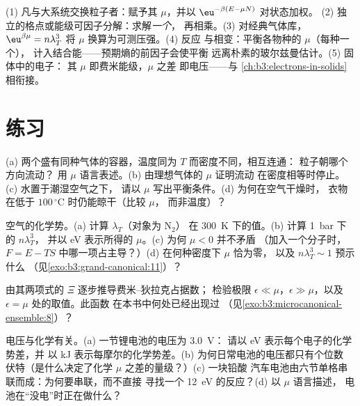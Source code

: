 \begin{method}[巨正则技巧]\label{met:b3:grand-canonical:method}
(1) 凡与大系统交换粒子者：赋予其
$\mu$，并以 $\eu^{-\beta(E - \mu N)}$ 对状态加权。
(2) 独立的格点或能级可因子分解：求解\emph{一个}，
再相乘。(3) 对经典气体库，$\eu^{\beta\mu} =
n\lambda_T^3$ 将 $\mu$ 换算为可测压强。(4) 反应
与相变：平衡各物种的 $\mu$（每种一个），
计入结合能——预期熵的前因子会使平衡
远离朴素的玻尔兹曼估计。(5) 固体中的电子：
其 $\mu$ 即费米能级，$\mu$ 之差
即电压——与
\cref{ch:b3:electrons-in-solids}相衔接。
\end{method}

\section{练习}

\begin{exercise}[$\star$]\label{exo:b3:grand-canonical:1}
(a) 两个盛有同种气体的容器，温度同为 $T$ 而密度不同，相互连通：
粒子朝哪个方向流动？
用 $\mu$ 语言表述。(b) 由理想气体的 $\mu$ 证明流动
在密度相等时停止。(c) 水置于潮湿空气之下，
请以 $\mu$ 写出平衡条件。(d) 为何在空气干燥时，
衣物在低于 $100\,^\circ$C 时仍能晾干（比较 $\mu$，
而非温度）？
\end{exercise}

\begin{exercise}[$\star$]\label{exo:b3:grand-canonical:2}
空气的化学势。(a) 计算 $\lambda_T$（对象为 N$_2$）
在 \qty{300}{K} 下的值。(b) 计算 \qty{1}{bar} 下的 $n\lambda_T^3$，
并以 eV 表示所得的 $\mu$。(c) 为何 $\mu < 0$ 并不矛盾
（加入一个分子时，$F = E - TS$ 中哪一项占主导？）(d)
在何种密度下 $\mu$ 恰为零，
以及 $n\lambda_T^3 \sim 1$ 预示什么
（见\cref{exo:b3:grand-canonical:11}）？
\end{exercise}

\begin{exercise}[$\star$]\label{exo:b3:grand-canonical:3}
由其两项式的 $\Xi$ 逐步推导费米–狄拉克占据数；
检验极限 $\epsilon \ll \mu$，$\epsilon \gg
\mu$，以及 $\epsilon = \mu$ 处的取值。此函数
在本书中何处已经出现过
（见\cref{exo:b3:microcanonical-ensemble:8}）？
\end{exercise}

\begin{exercise}[$\star$]\label{exo:b3:grand-canonical:4}
电压与化学有关。(a) 一节锂电池的电压为 \qty{3.0}{V}：
请以 eV 表示每个电子的化学势差，并
以 kJ 表示每摩尔的化学势差。(b) 为何日常电池的电压都只有个位数
伏特（是什么决定了化学 $\mu$ 之差的量级？）(c) 一块铅酸
汽车电池由六节单格串联而成：为何要串联，而不直接
寻找一个 \qty{12}{eV} 的反应？(d) 以 $\mu$ 语言描述，
电池在“没电”时正在做什么？
\end{exercise}

